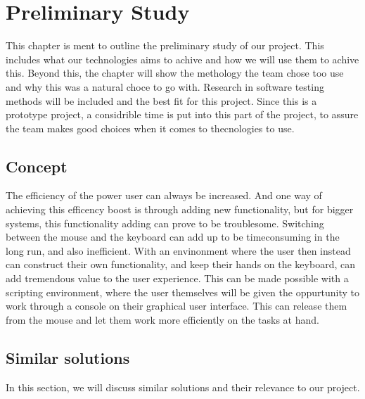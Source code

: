 \chapter{Preliminary Study}

\minitoc

This chapter is ment to outline the preliminary study of our project. This includes what our technologies aims to achive and how we will use them to achive this. Beyond this, the chapter will show the methology the team chose too use and why this was a natural choce to go with. Research in software testing methods will be included and the best fit for this project. Since this is a prototype project, a considrible time is put into this part of the project, to assure the team makes good choices when it comes to thecnologies to use.

\clearpage

\section{Concept}
The efficiency of the power user can always be increased. And one way of achieving this efficency boost is through adding new functionality, but for bigger systems, this functionality adding can prove to be troublesome. Switching between the mouse and the keyboard can add up to be timeconsuming in the long run, and also inefficient. With an envinonment where the user then instead can construct their own functionality, and keep their hands on the keyboard, can add tremendous value to the user experience. This can be made possible with a scripting environment, where the user themselves will be given the oppurtunity to work through a console on their graphical user interface. This can release them from the mouse and let them work more efficiently on the tasks at hand. 

\section{Similar solutions}
In this section, we will discuss similar solutions and their relevance to our project.

